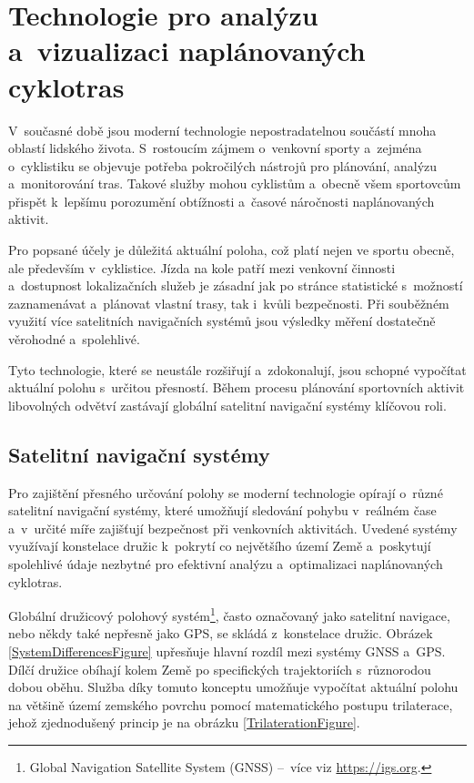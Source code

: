 \chapter{Technologie pro analýzu a~vizualizaci naplánovaných cyklotras}
\label{technology-for-analysis-and-visualisation-of-planned-cycle-routes}

V~současné době jsou moderní technologie nepostradatelnou součástí mnoha oblastí lidského života.
S~rostoucím zájmem o~venkovní sporty a~zejména o~cyklistiku se objevuje potřeba pokročilých nástrojů pro plánování, analýzu a~monitorování tras.
Takové služby mohou cyklistům a~obecně všem sportovcům přispět k~lepšímu porozumění obtížnosti a~časové náročnosti naplánovaných aktivit.

Pro popsané účely je důležitá aktuální poloha, což platí nejen ve sportu obecně, ale především v~cyklistice.
Jízda na kole patří mezi venkovní činnosti a~dostupnost lokalizačních služeb je zásadní jak po stránce statistické s~možností zaznamenávat a~plánovat vlastní trasy, tak i~kvůli bezpečnosti.
Při souběžném využití více satelitních navigačních systémů jsou výsledky měření dostatečně věrohodné a~spolehlivé.

Tyto technologie, které se neustále rozšiřují a~zdokonalují, jsou schopné vypočítat aktuální polohu s~určitou přesností.
Během procesu plánování sportovních aktivit libovolných odvětví zastávají globální satelitní navigační systémy klíčovou roli.

\section{Satelitní navigační systémy}
\label{satellite-navigation-systems}

Pro zajištění přesného určování polohy se moderní technologie opírají o~různé satelitní navigační systémy, které umožňují sledování pohybu v~reálném čase a~v~určité míře zajišťují bezpečnost při venkovních aktivitách.
Uvedené systémy využívají konstelace družic k~pokrytí co největšího území Země a~poskytují spolehlivé údaje nezbytné pro efektivní analýzu a~optimalizaci naplánovaných cyklotras.

Globální družicový polohový systém\footnote{Global Navigation Satellite System (GNSS) --~více viz \url{https://igs.org}.}, často označovaný jako satelitní navigace, nebo někdy také nepřesně jako GPS, se skládá z~konstelace družic.
Obrázek \ref{SystemDifferencesFigure} upřesňuje hlavní rozdíl mezi systémy GNSS a~GPS.
Dílčí družice obíhají kolem Země po specifických trajektoriích s~různorodou dobou oběhu.
Služba díky tomuto konceptu umožňuje vypočítat aktuální polohu na většině území zemského povrchu pomocí matematického postupu trilaterace, jehož zjednodušený princip je na obrázku \ref{TrilaterationFigure}.

